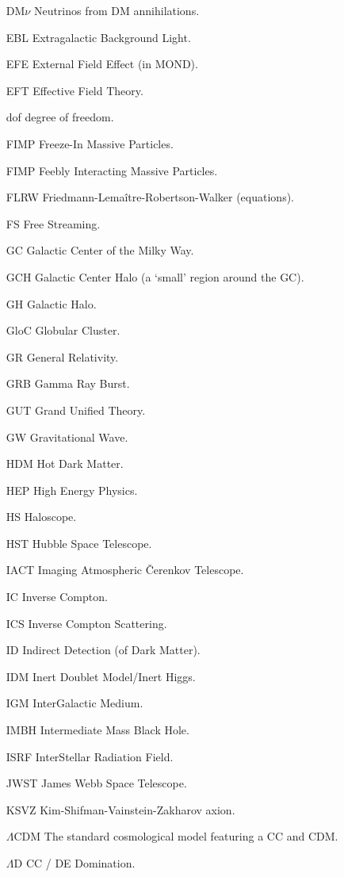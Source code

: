 \begin{multicols}{2}
\begin{itemize}
\item[DM$\nu$] Neutrinos from DM annihilations.
\item[EBL] Extragalactic Background Light.
\item[EFE] External Field Effect (in MOND).
\item[EFT] Effective Field Theory.
\item[dof] degree of freedom.
\item[FIMP] Freeze-In Massive Particles.
\item[FIMP] Feebly Interacting Massive Particles.
\item[FLRW] Friedmann-Lema\^itre-Robertson-Walker (equations). 
\item[FS] Free Streaming.
\item[GC] Galactic Center of the Milky Way.
\item[GCH] Galactic Center Halo (a `small' region around the GC).
\item[GH] Galactic Halo.
\item[GloC] Globular Cluster.
\item[GR] General Relativity.
\item[GRB] Gamma Ray Burst.
\item[GUT] Grand Unified Theory.
\item[GW] Gravitational Wave.
\item[HDM] Hot Dark Matter.
\item[HEP] High Energy Physics.
\item[HS] Haloscope.
\item[HST] Hubble Space Telescope.
\item[IACT] Imaging Atmospheric \v Cerenkov Telescope.
\item[IC] Inverse Compton.
\item[ICS] Inverse Compton Scattering.
\item[ID] Indirect Detection (of Dark Matter).
\item[IDM] Inert Doublet Model/Inert Higgs.
\item[IGM] InterGalactic Medium.
\item[IMBH] Intermediate Mass Black Hole.
\item[ISRF] InterStellar Radiation Field.
\item[JWST] James Webb Space Telescope.
\item[KSVZ] Kim-Shifman-Vainstein-Zakharov axion.
\item[$\Lambda$CDM] The standard cosmological model featuring a CC and CDM.
\item[$\Lambda$D] CC / DE Domination.

\end{itemize}
\end{multicols}
